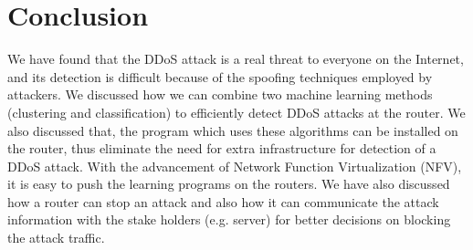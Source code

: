 \documentclass[12pt,oneside,a4paper]{article}
\begin{document}
\section{Conclusion}
We have found that the DDoS attack is a real threat to everyone on the Internet, and its detection is difficult because of the spoofing techniques employed by attackers. We discussed how we can combine two machine learning methods (clustering and classification) to efficiently detect DDoS attacks at the router. We also discussed that, the program which uses these algorithms can be installed on the router, thus eliminate the need for extra infrastructure for detection of a DDoS attack. With the advancement of Network Function Virtualization (NFV), it is easy to push the learning programs on the routers. We have also discussed how a router can stop an attack and also how it can communicate the attack information with the stake holders (e.g. server) for better decisions on blocking the attack traffic.

\pagebreak

\singlespacing
\end{document}
